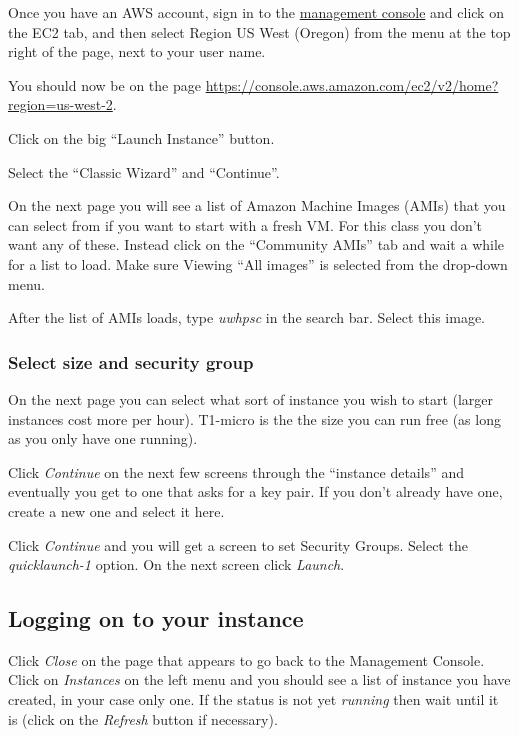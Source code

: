 \documentclass[letterpaper,10pt,english]{sphinxmanual}
\begin{document}
Once you have an AWS account, sign in to the
\href{https://console.aws.amazon.com/ec2/}{management console}
and click on the
EC2 tab, and then select Region US West (Oregon) from the menu
at the top right of the page, next to your user name.

You should now be on the page
\href{https://console.aws.amazon.com/ec2/v2/home?region=us-west-2}{https://console.aws.amazon.com/ec2/v2/home?region=us-west-2}.

Click on the big ``Launch Instance'' button.

Select the ``Classic Wizard'' and ``Continue''.

On the next page you will see a list of Amazon Machine Images (AMIs) that
you can select from if you want to start with a fresh VM.  For this class
you don't want any of these.  Instead click on the ``Community AMIs'' tab and
wait a while for a list to load.
Make sure Viewing ``All images'' is selected from the drop-down menu.

After the list of AMIs loads, type \emph{uwhpsc} in the search bar.
Select this image.


\subsubsection{Select size and security group}
\label{aws:select-size-and-security-group}\label{aws:aws-select-size}
On the next page you can select what sort of instance you wish to start (larger
instances cost more per hour). T1-micro is the the size you can run free (as
long as you only have one running).

Click \emph{Continue} on the next few screens through the ``instance details''
and eventually you get to one that
asks for a key pair.  If you don't already have one, create a new one and
select it here.

Click \emph{Continue} and you will get a screen to set Security Groups.  Select
the \emph{quicklaunch-1} option.  On the next screen click \emph{Launch}.


\subsection{Logging on to your instance}
\label{aws:logging-on-to-your-instance}
Click \emph{Close} on the  page that appears to
go back to the Management Console.  Click on \emph{Instances} on the left menu
and you should see a list of instance you
have created, in your case only one.  If the status is not yet \emph{running}
then wait until it is (click on the \emph{Refresh} button if necessary).
\end{document}
